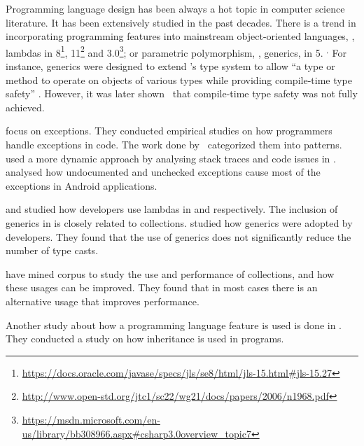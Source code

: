 Programming language design has been always a hot topic in computer science literature.
It has been extensively studied in the past decades.
There is a trend in incorporating programming features into mainstream object-oriented languages, \eg,
lambdas in \java{} 8\footnote{\url{https://docs.oracle.com/javase/specs/jls/se8/html/jls-15.html\#jls-15.27}},
\cpp{}11\footnote{\url{http://www.open-std.org/jtc1/sc22/wg21/docs/papers/2006/n1968.pdf}} and
\csharp{} 3.0\footnote{\url{https://msdn.microsoft.com/en-us/library/bb308966.aspx\#csharp3.0overview\_topic7}};
or parametric polymorphism, \ie{}, generics, in \java{} 5.%
%
\(^{,}\)%
For instance, \java{} generics were designed to extend
\java's type system to allow
``a type or method to operate on objects of various types while
providing compile-time type safety''
\citep{Gosling:2013:JLS:2462622}.
However, it was later shown~\citep{aminJavaScalaType2016} that 
compile-time type safety was not fully achieved.

\cite{keryExaminingProgrammerPractices2016,asaduzzamanHowDevelopersUse2016} focus on exceptions.
They conducted empirical studies on how programmers handle exceptions in \java{} code.
The work done by~\cite{nakshatriAnalysisExceptionHandling2016} categorized them into patterns.
\cite{coelhoUnveilingExceptionHandling2015} used a more dynamic approach by analysing stack traces and code issues in \github{}.
\cite{kechagiaUndocumentedUncheckedExceptions2014} analysed how undocumented and
unchecked exceptions cause most of the exceptions in
Android applications.

\cite{mazinanianUnderstandingUseLambda2017} and \cite{uesbeckEmpiricalStudyImpact2016} studied how developers use lambdas in \java{} and \cpp{} respectively.
The inclusion of generics in \java{} is closely related to collections. 
\cite{parninJavaGenericsAdoption2011,parninAdoptionUseJava2013} studied how generics were adopted by \java{} developers.
They found that the use of generics does not significantly reduce the number of type casts.

\cite{costaEmpiricalStudyUsage2017} have mined \github{} corpus to study the use and performance of collections,
and how these usages can be improved.
They found that in most cases there is an alternative usage that improves performance.

Another study about how a programming language feature is used is done in
\cite{temperoHowJavaPrograms2008}.
They conducted a study on how inheritance is used in \java{} programs.

